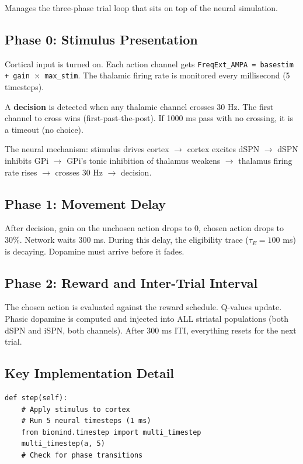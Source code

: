 \documentclass[11pt,a4paper]{article}
\begin{document}
Manages the three-phase trial loop that sits on top of the neural simulation.

\subsection{Phase 0: Stimulus Presentation}

Cortical input is turned on. Each action channel gets \texttt{FreqExt\_AMPA = basestim + gain $\times$ max\_stim}. The thalamic firing rate is monitored every millisecond (5 timesteps).

A \textbf{decision} is detected when any thalamic channel crosses 30 Hz. The first channel to cross wins (first-past-the-post). If 1000 ms pass with no crossing, it is a timeout (no choice).

The neural mechanism: stimulus drives cortex $\rightarrow$ cortex excites dSPN $\rightarrow$ dSPN inhibits GPi $\rightarrow$ GPi's tonic inhibition of thalamus weakens $\rightarrow$ thalamus firing rate rises $\rightarrow$ crosses 30 Hz $\rightarrow$ decision.

\subsection{Phase 1: Movement Delay}

After decision, gain on the unchosen action drops to 0, chosen action drops to 30\%. Network waits 300 ms. During this delay, the eligibility trace ($\tau_E = 100$ ms) is decaying. Dopamine must arrive before it fades.

\subsection{Phase 2: Reward and Inter-Trial Interval}

The chosen action is evaluated against the reward schedule. Q-values update. Phasic dopamine is computed and injected into ALL striatal populations (both dSPN and iSPN, both channels). After 300 ms ITI, everything resets for the next trial.

\subsection{Key Implementation Detail}

\begin{lstlisting}
def step(self):
    # Apply stimulus to cortex
    # Run 5 neural timesteps (1 ms)
    from biomind.timestep import multi_timestep
    multi_timestep(a, 5)
    # Check for phase transitions
\end{lstlisting}
\end{document}
